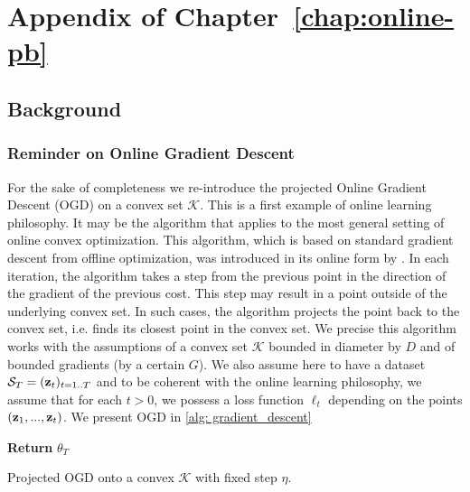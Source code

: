 \chapter{Appendix of Chapter~\ref{chap:online-pb}}
\label{ap: online-pb}



\section{Background}

\subsection{Reminder on Online Gradient Descent }
\label{sec: OGD_reminder}

For the sake of completeness we re-introduce the projected Online Gradient Descent (OGD) on a convex set $\mathcal{K}$. This is a first example of online learning philosophy. It may be the algorithm that applies to the most general setting
of online convex optimization. This algorithm,
which is based on standard gradient descent from offline optimization, was
introduced in its online form by \cite{zinkevich2003online}.
In each iteration, the algorithm takes a step from the previous point in
the direction of the gradient of the previous cost. This step may result in
a point outside of the underlying convex set. In such cases, the algorithm
projects the point back to the convex set, i.e. finds its closest point in the
convex set. We precise this algorithm works with the assumptions of a convex set $\mathcal{K}$ bounded in diameter by $D$ and of bounded gradients (by a certain $G$).
We also assume here to have a dataset $\mathcal{S}_T=(\mathbf{z}_t)_{t=1..T}$ and to be coherent with the online learning philosophy, we assume that for each $t>0$, we possess a loss function $\ell_t$ depending on the points $(\mathbf{z}_1,...,\mathbf{z}_t)$. We present OGD in \cref{alg: gradient_descent}


\begin{algorithm}[ht]
 \SetAlgoLined
\textbf{Return} $\theta_{T}$
 \caption{Projected OGD onto a convex $\mathcal{K}$ with fixed step $\eta$.}
 \label{alg: gradient_descent}
 \end{algorithm}

